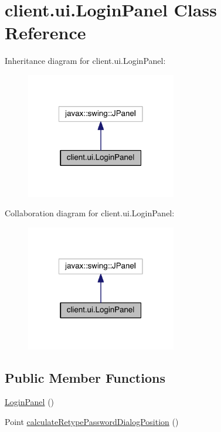 \hypertarget{classclient_1_1ui_1_1_login_panel}{}\section{client.\+ui.\+Login\+Panel Class Reference}
\label{classclient_1_1ui_1_1_login_panel}


Inheritance diagram for client.\+ui.\+Login\+Panel\+:
\nopagebreak
\begin{figure}[H]
\begin{center}
\leavevmode
\includegraphics[width=186pt]{classclient_1_1ui_1_1_login_panel__inherit__graph}
\end{center}
\end{figure}


Collaboration diagram for client.\+ui.\+Login\+Panel\+:
\nopagebreak
\begin{figure}[H]
\begin{center}
\leavevmode
\includegraphics[width=186pt]{classclient_1_1ui_1_1_login_panel__coll__graph}
\end{center}
\end{figure}
\subsection*{Public Member Functions}
\begin{DoxyCompactItemize}
\item 
\hyperlink{classclient_1_1ui_1_1_login_panel_a697f38b937f048e562c634c713d90885}{Login\+Panel} ()
\item 
Point \hyperlink{classclient_1_1ui_1_1_login_panel_a9726aa2bc3416aa22ad43d2b4b9eed70}{calculate\+Retype\+Password\+Dialog\+Position} ()
\end{DoxyCompactItemize}
